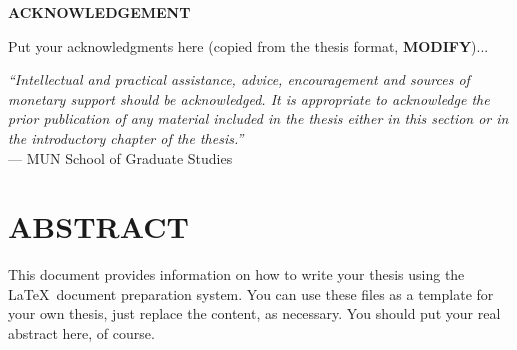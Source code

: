 \documentclass[english,a4paper,11pt]{report}
\newcommand{\precursortitle}[1]{
	\begin{center}
		\textbf{\Large #1}
	\end{center}
}
\begin{document}
	\precursortitle{\MakeUppercase{Acknowledgement}}
	\vspace{1cm}
	
	Put your acknowledgments here (copied from the thesis format, \textbf{MODIFY})...
	\vspace{1cm}
	
	\noindent\emph{``Intellectual and practical assistance, advice, encouragement and
		sources of monetary support should be acknowledged. It is appropriate to
		acknowledge the prior publication of any material included in the thesis
		either in this section or in the introductory chapter of the thesis.''}\\
	
	\hfill --- MUN School of Graduate Studies
	\clearpage
	
	\newpage
	
	\thispagestyle{plain}

	\tableofcontents
	\clearpage
	
	\newpage
	\listoftables
	
	\newpage
	\listoffigures
	
	\newpage
	\chapter*{\MakeUppercase{Abstract}}
	
	\singlespacing
	\hspace*{0.25cm}
	
	This document provides information on how to write your thesis using
	the \LaTeX\ document preparation system.  You can use these files as a
	template for your own thesis, just replace the content, as necessary.
	You should put your real abstract here, of course.
	
\end{document}

